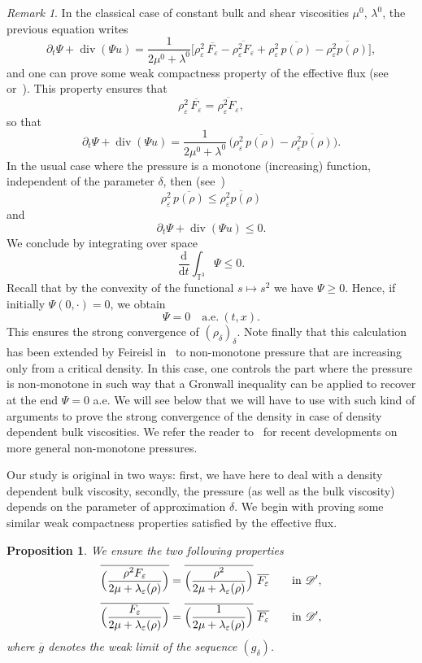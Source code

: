 \documentclass[10pt]{amsart}
\let\mathcal\mathscr
\newcommand{\<}{\bigl\langle}
\renewcommand{\>}{\bigr\rangle}
\newtheorem{prop}[thm]{Proposition}
\theoremstyle{definition}
\theoremstyle{remark}
\newtheorem{remark}{Remark}
\newcommand{\TT}{\mathbb{T}^3}
\DeclareMathOperator{\Div}{div}
\newcommand{\Dt}{\dfrac{\mathrm{d}}{\mathrm{d} t}}
\let\ov\overline
\let\ep\varepsilon
\begin{document}
\begin{remark}
In the classical case of constant bulk and shear viscosities $\mu^0$, $\lambda^0$, the previous equation writes
\[
\partial_t \Psi + \Div(\Psi u)
= \dfrac{1}{2\mu^0 + \lambda^0} \bigl[\rho_\ep^2\, \ov{F_\ep } - \ov{\rho_\ep^2 F_\ep }
+ \rho_\ep^2\, \ov{ p(\rho)} - \ov{ \rho_\ep^2 p(\rho)}
\bigr],
\]
and one can prove some weak compactness property of the effective flux (see~\cite[Chap.\,5]{lions1998} or~\cite{novotny2004}).
This property ensures that
\[
\rho_\ep^2\, \ov{F_\ep } = \ov{\rho_\ep^2 F_\ep},
\]
so that
\[
\partial_t \Psi + \Div(\Psi u) = \dfrac{1}{2\mu^0 + \lambda^0}\,\bigl(\rho_\ep^2\, \ov{ p(\rho)} - \ov{ \rho_\ep^2 p(\rho)}\bigr).
\]
In the usual case where the pressure is a monotone (increasing) function, independent of the parameter $\delta$, then (see~\cite[Lem.\,3.35]{novotny2004})
\begin{equation}\label{eq:monotone-press}
\rho_\ep^2\, \ov{ p(\rho)} \leq \ov{ \rho_\ep^2 p(\rho)}
\end{equation}
and\vspace*{-3pt}
\[
\partial_t \Psi + \Div(\Psi u) \leq 0.
\]
We conclude by integrating over space
\[
\Dt \int_{\TT}\Psi \leq 0.
\]
Recall that by the convexity of the functional $s \mapsto s^2$ we have $\Psi \geq 0$.
Hence, if initially $\Psi(0,\cdot) = 0$, we obtain
\[
\Psi = 0 \quad \text{a.e.} ~(t,x).
\]
This ensures the strong convergence of $(\rho_\delta)_\delta$.
Note finally that this calculation has been extended by {Feireisl} in~\cite{feireisl2002} to non-monotone pressure that are increasing only from a critical density. In this case, one controls the part where the pressure is non-monotone in such way that a Gronwall inequality can be applied to recover at the end $\Psi = 0$ a.e.
We will see below that we will have to use with such kind of arguments to prove the strong convergence of the density in case of density dependent bulk viscosities.
We refer the reader to~\cite{bresch2018} for recent developments on more general non-monotone pressures.
\end{remark} 

Our study is original in two ways: first, we have here to deal with a density dependent bulk viscosity, secondly, the pressure (as well as the bulk viscosity) depends on the parameter of approximation $\delta$.
We begin with proving some similar weak compactness properties satisfied by the effective flux.

\begin{prop}\label{prop:compactness_F}
We ensure the two following properties
\begin{align}\label{prop:compactness_F_1}
\ov{\Bigl(\dfrac{\rho^2 F_\ep}{2\mu +\lambda_\ep(\rho)} \Bigr)} &= \ov{\Bigl(\dfrac{\rho^2}{2\mu +\lambda_\ep(\rho)}\Bigr)}~ \ov{F_\ep}\qquad \text{in } \mathcal{D}',\\[3pt]
\label{prop:compactness_F_2}
\ov{\Bigl(\dfrac{F_\ep}{2\mu +\lambda_\ep(\rho)}\Bigr)} &= \ov{\Bigl(\dfrac{1}{2\mu +\lambda_\ep(\rho)}\Bigr)}~ \ov{F_\ep}\qquad \text{in } \mathcal{D}',
\end{align}
where $\ov{g}$ denotes the weak limit of the sequence $(g_\delta)$.
\end{prop}
\end{document}
